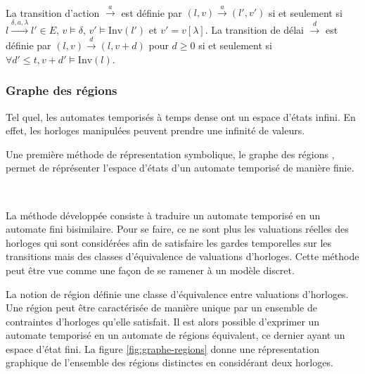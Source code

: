 \documentclass{article}
\begin{document}
        ~

        La transition d'action $\xrightarrow{a}$ est définie par $(l,v)
        \xrightarrow{a}(l',v')$ si et seulement si $l\xrightarrow{\delta, a,
          \lambda}l' \in E$, $v \models \delta$, $v'\models \mathrm{Inv}(l')$ et
        $v' = v[\lambda]$. La transition de délai $\xrightarrow{d}$ est définie
        par $(l,v) \xrightarrow{d}(l,v+d)$ pour $d \geq 0$ si et seulement si
        $\forall d' \leq t, v+d' \models \mathrm{Inv}(l)$.

      \subsubsection{Graphe des régions}
    
        Tel quel, les automates temporisés à temps dense ont un espace d'états
        infini. En effet, les horloges manipulées peuvent prendre une infinité
        de valeurs.
        
        Une première méthode de répresentation symbolique, le graphe des régions
        \cite{alur94}, permet de réprésenter l'espace d'états d'un automate
        temporisé de manière finie.

        ~

        La méthode développée consiste à traduire un automate temporisé en un
        automate fini bisimilaire. Pour se faire, ce ne sont plus les valuations
        réelles des horloges qui sont considérées afin de satisfaire les gardes
        temporelles sur les transitions mais des classes d'équivalence de
        valuations d'horloges. Cette méthode peut être vue comme une façon de se
        ramener à un modèle discret.
        
        La notion de région définie une classe d'équivalence entre valuations
        d'horloges. Une région peut être caractérisée de manière unique par un
        ensemble de contraintes d'horloges qu'elle satisfait. Il est alors
        possible d'exprimer un automate temporisé en un automate de régions
        équivalent, ce dernier ayant un espace d'état fini. La figure
        \ref{fig:graphe-regions} donne une répresentation graphique de
        l'ensemble des régions distinctes en considérant deux horloges.

        ~
\end{document}
